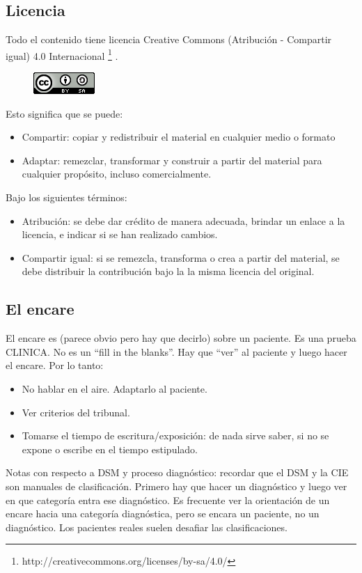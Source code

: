 \documentclass{scrbook}
\begin{document}
\subsection*{Licencia}
Todo el contenido tiene licencia Creative Commons (Atribución - Compartir igual) 4.0 Internacional \footnote{http://creativecommons.org/licenses/by-sa/4.0/} .
\begin{figure}
	\centering
	\includegraphics{cc.png}
\end{figure}
Esto significa que se puede:
\begin{itemize}
\item Compartir: copiar y redistribuir el material en cualquier medio o formato
\item Adaptar: remezclar, transformar y construir a partir del material para cualquier propósito, incluso comercialmente.
\end{itemize}
Bajo los siguientes términos:
\begin{itemize}
	\item Atribución: se debe dar crédito de manera adecuada, brindar un enlace a la licencia, e indicar si se han realizado cambios.
	\item Compartir igual: si se remezcla, transforma o crea a partir del material, se debe distribuir la contribución bajo la la misma licencia del original.
\end{itemize}
\subsection*{El encare}
El encare es (parece obvio pero hay que decirlo) sobre un paciente. Es una prueba CLINICA. No es un ``fill in the blanks''. Hay que ``ver'' al paciente y luego hacer el encare. Por lo tanto:
\begin{itemize}
	\item No hablar en el aire. Adaptarlo al paciente.
	\item Ver criterios del tribunal.
	\item Tomarse el tiempo de escritura/exposición: de nada sirve saber, si no se expone o escribe en el tiempo estipulado.
\end{itemize}
Notas con respecto a DSM y proceso diagnóstico: recordar que el DSM y la CIE son manuales de clasificación. Primero hay que hacer un diagnóstico y luego ver en que categoría entra ese diagnóstico. Es frecuente ver la orientación de un encare hacia una categoría diagnóstica, pero se encara un paciente, no un diagnóstico. Los pacientes reales suelen desafiar las clasificaciones.
\end{document}
